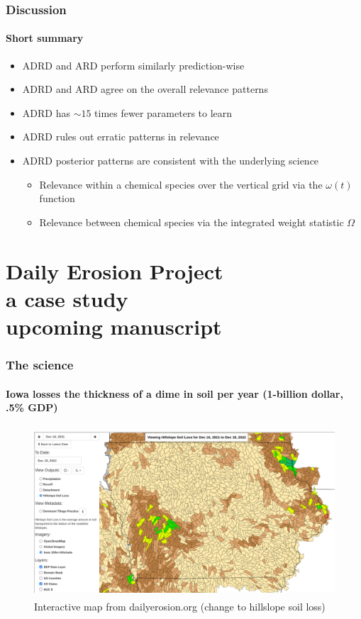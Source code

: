\documentclass{snedecorbeamer}
\begin{document}
\begin{frame}
  \frametitle{Discussion}
  \framesubtitle{Short summary}

  \begin{itemize}
  \item ADRD and ARD perform similarly prediction-wise
  \item ADRD and ARD agree on the overall relevance patterns
  \item ADRD has $\sim15$ times fewer parameters to learn
  \item ADRD rules out erratic patterns in relevance
  \item ADRD posterior patterns are consistent with the underlying science
    \begin{itemize}
    \item Relevance within a chemical species over the vertical grid via the
      $\omega(t)$ function
    \item Relevance between chemical species via the integrated weight statistic
      $\Omega$
    \end{itemize}
  \end{itemize}
\end{frame}

\section{Daily Erosion Project \\ {\small a case study} \\
  {\tiny upcoming manuscript}}

\begin{frame}
  \frametitle{The science}
  \framesubtitle{Iowa losses the thickness of a dime in soil per year (1-billion
    dollar, .5\% GDP)}

  \begin{figure}
    \centering
    \includegraphics[height=17em]{inc/dep_soilloss_map_20221215_168.png}
      \caption*{%
        \href{https://bit.ly/3HZyaRl}{}
        Interactive map from dailyerosion.org (change to hillslope soil loss)}
  \end{figure}
\end{frame}
\end{document}

